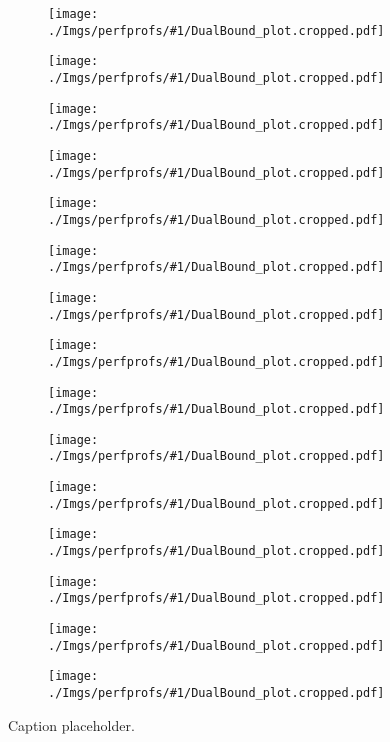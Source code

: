 
\newcommand{\IncludePerfProfSubFiguresBatchOne}[1]{
	\begin{subfigure}{0.30\textwidth}
		\centering
		\texttt{[image: ./Imgs/perfprofs/\#1/DualBound\_plot.cropped.pdf]}
	\end{subfigure}
}

\begin{figure}[t]
	\IncludePerfProfSubFiguresBatchOne{Fractional-labeling-comparison-for-E-scaled-1.0}
	\hfill
	\IncludePerfProfSubFiguresBatchOne{Fractional-labeling-comparison-for-E-scaled-2.0}
	\hfill
	\IncludePerfProfSubFiguresBatchOne{Fractional-labeling-comparison-for-E-scaled-4.0}

	\IncludePerfProfSubFiguresBatchOne{Fractional-labeling-comparison-for-F-scaled-1.0}
	\hfill
	\IncludePerfProfSubFiguresBatchOne{Fractional-labeling-comparison-for-F-scaled-2.0}
	\hfill
	\IncludePerfProfSubFiguresBatchOne{Fractional-labeling-comparison-for-F-scaled-4.0}

	\IncludePerfProfSubFiguresBatchOne{Fractional-labeling-comparison-for-A-scaled-1.0}
	\hfill
	\IncludePerfProfSubFiguresBatchOne{Fractional-labeling-comparison-for-A-scaled-2.0}
	\hfill
	\IncludePerfProfSubFiguresBatchOne{Fractional-labeling-comparison-for-A-scaled-4.0}

	\IncludePerfProfSubFiguresBatchOne{Fractional-labeling-comparison-for-B-scaled-1.0}
	\hfill
	\IncludePerfProfSubFiguresBatchOne{Fractional-labeling-comparison-for-B-scaled-2.0}
	\hfill
	\IncludePerfProfSubFiguresBatchOne{Fractional-labeling-comparison-for-B-scaled-4.0}

	\IncludePerfProfSubFiguresBatchOne{Fractional-labeling-comparison-for-P-scaled-1.0}
	\hfill
	\IncludePerfProfSubFiguresBatchOne{Fractional-labeling-comparison-for-P-scaled-2.0}
	\hfill
	\IncludePerfProfSubFiguresBatchOne{Fractional-labeling-comparison-for-P-scaled-2.0}

	\caption{
		Caption placeholder.
	}
	\label{fig:perfprofs-batch1-part1}
\end{figure}
